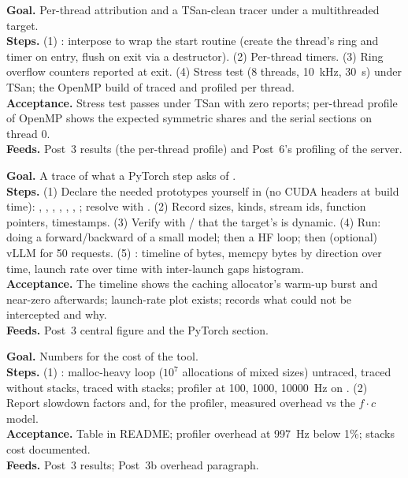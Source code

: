 \textbf{Goal.} Per-thread attribution and a TSan-clean tracer under a multithreaded target.\\
\textbf{Steps.} (1) : interpose  to wrap the start routine (create the thread's ring and timer on entry, flush on exit via a  destructor). (2) Per-thread  timers. (3) Ring overflow counters reported at exit. (4) Stress test (8 threads, 10~kHz, 30~s) under TSan; the OpenMP build of  traced and profiled per thread.\\
\textbf{Acceptance.} Stress test passes under TSan with zero reports; per-thread profile of OpenMP  shows the expected symmetric shares and the serial sections on thread 0.\\
\textbf{Feeds.} Post~3 results (the per-thread profile) and Post~6's profiling of the server.

\textbf{Goal.} A trace of what a PyTorch step asks of .\\
\textbf{Steps.} (1) Declare the needed prototypes yourself in  (no CUDA headers at build time): , , , , , , ; resolve with . (2) Record sizes, kinds, stream ids, function pointers, timestamps. (3) Verify with / that the target's  is dynamic. (4) Run:  doing a forward/backward of a small model; then a HF  loop; then (optional) vLLM for 50 requests. (5) : timeline of  bytes, memcpy bytes by direction over time, launch rate over time with inter-launch gaps histogram.\\
\textbf{Acceptance.} The timeline shows the caching allocator's warm-up burst and near-zero  afterwards; launch-rate plot exists;  records what could not be intercepted and why.\\
\textbf{Feeds.} Post~3 central figure and the PyTorch section.

\textbf{Goal.} Numbers for the cost of the tool.\\
\textbf{Steps.} (1) : malloc-heavy loop ($10^7$ allocations of mixed sizes) untraced, traced without stacks, traced with stacks; profiler at 100, 1000, 10000~Hz on . (2) Report slowdown factors and, for the profiler, measured overhead vs the $f\cdot c$ model.\\
\textbf{Acceptance.} Table in README; profiler overhead at 997~Hz below 1\%; stacks cost documented.\\
\textbf{Feeds.} Post~3 results; Post~3b overhead paragraph.


